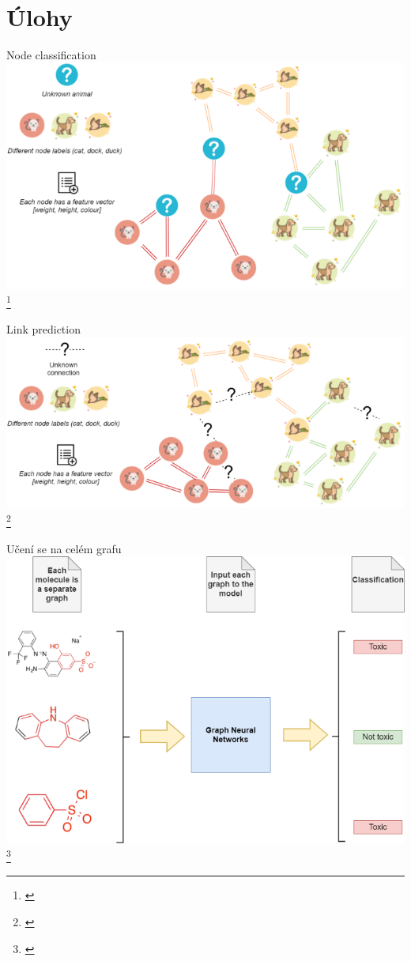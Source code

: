 \documentclass[10pt]{beamer}
\begin{document}
\section{Úlohy}

\begin{frame}{Node classification}
	\centering
	\includegraphics[width=0.7\pagewidth]{images/node-classification.png}\footnote{\cite{kubara_machine_2020}}
\end{frame}

\begin{frame}{Link prediction}
	\centering
	\includegraphics[width=0.7\pagewidth]{images/link-prediction.png}\footnote{\cite{kubara_machine_2020}}
\end{frame}

\begin{frame}{Učení se na celém grafu}
	\centering
	\includegraphics[width=0.7\pagewidth]{images/whole-graph-learning.png}\footnote{\cite{kubara_machine_2020}}
\end{frame}
\end{document}
